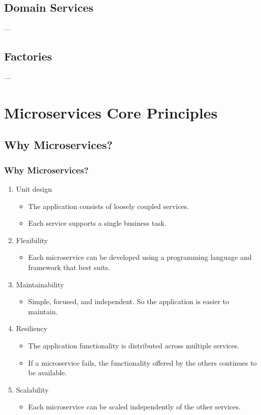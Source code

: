 \documentclass{beamer}
\begin{document}
	\subsection {Domain Services}
		\begin{frame}
		---
		\end{frame}

	\subsection {Factories}
		\begin{frame}
		---
		\end{frame}
	
		
\section {Microservices Core Principles}
	
	\subsection	{Why Microservices?}
		\begin{frame}
			\frametitle{Why Microservices?}
				\begin{enumerate}
					\item<1-> Unit design
						\begin{itemize}
							\item \scriptsize {The application consists of loosely coupled services}. 
							\item \scriptsize {Each service supports a single business task}.
						\end{itemize}
					\item<2-> Flexibility
						\begin{itemize}
							\item \scriptsize {Each microservice can be developed using a programming language and framework that best suits}.
						\end{itemize}
					\item<3-> Maintainability
						\begin{itemize}
							\item \scriptsize {Simple, focused, and independent. So the application is easier to maintain}.
						\end{itemize}
					\item<4-> Resiliency
						\begin{itemize}
							\item \scriptsize {The application functionality is distributed across multiple services}. 
							\item \scriptsize {If a microservice fails, the functionality offered by the others continues to be available}.
						\end{itemize}
					\item<5-> Scalability
						\begin{itemize}
							\item \scriptsize {Each microservice can be scaled independently of the other services}.
						\end{itemize}
				\end{enumerate}
		\end{frame}
\end{document}
